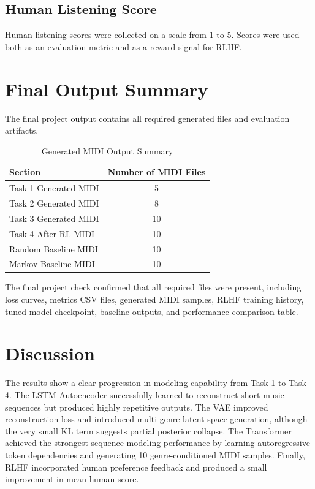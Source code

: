 \documentclass[conference]{IEEEtran}
\begin{document}
\subsection{Human Listening Score}

Human listening scores were collected on a scale from 1 to 5. Scores were used both as an evaluation metric and as a reward signal for RLHF.

\section{Final Output Summary}

The final project output contains all required generated files and evaluation artifacts.

\begin{table}[h]
\centering
\caption{Generated MIDI Output Summary}
\begin{tabular}{lc}
\toprule
Section & Number of MIDI Files \\
\midrule
Task 1 Generated MIDI & 5 \\
Task 2 Generated MIDI & 8 \\
Task 3 Generated MIDI & 10 \\
Task 4 After-RL MIDI & 10 \\
Random Baseline MIDI & 10 \\
Markov Baseline MIDI & 10 \\
\bottomrule
\end{tabular}
\end{table}

The final project check confirmed that all required files were present, including loss curves, metrics CSV files, generated MIDI samples, RLHF training history, tuned model checkpoint, baseline outputs, and performance comparison table.

\section{Discussion}

The results show a clear progression in modeling capability from Task 1 to Task 4. The LSTM Autoencoder successfully learned to reconstruct short music sequences but produced highly repetitive outputs. The VAE improved reconstruction loss and introduced multi-genre latent-space generation, although the very small KL term suggests partial posterior collapse. The Transformer achieved the strongest sequence modeling performance by learning autoregressive token dependencies and generating 10 genre-conditioned MIDI samples. Finally, RLHF incorporated human preference feedback and produced a small improvement in mean human score.
\end{document}
